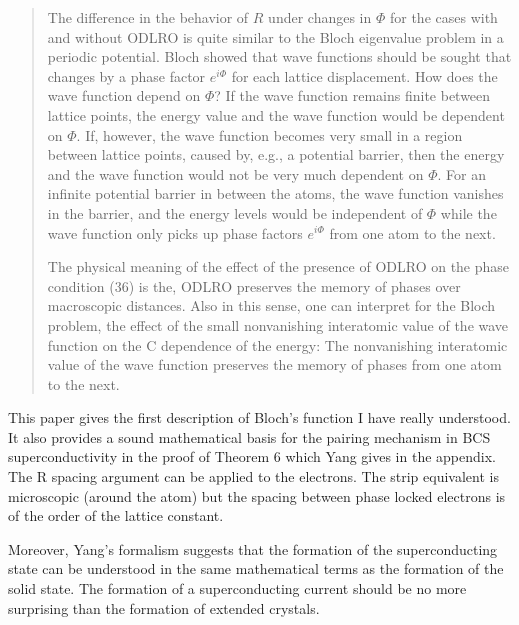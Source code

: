 \documentclass{article}
\begin{document}
\begin{quote}
  The difference in the behavior of $R$ under changes in $\Phi$ for the cases 
with and without ODLRO is quite similar to the Bloch eigenvalue problem
in a periodic potential. Bloch showed that wave functions should be sought 
that changes by a phase factor $e^{i\Phi}$ for each lattice displacement. How does the 
wave function depend on $\Phi$? If the wave function remains finite between lattice points, 
the energy value and the wave function would be dependent on $\Phi$. If, however, 
the wave function becomes very small in a region between lattice points, 
caused by, e.g., a potential barrier, then the energy and the wave function 
would not be very much dependent on $\Phi$. For an infinite potential barrier in 
between the atoms, the wave function vanishes in the barrier, and the energy 
levels would be independent of $\Phi$ while the
wave function only picks up phase factors $e^{i\Phi}$ from one atom to the next.

  The physical meaning of the effect of the presence of ODLRO on the 
phase condition (36) is the, ODLRO preserves the memory of phases over 
macroscopic distances. Also in this sense, one can interpret for the 
Bloch problem, the effect of the small nonvanishing interatomic 
value of the wave function on the C dependence of the energy: 
The nonvanishing interatomic value of the wave function preserves the 
memory of phases from one atom to the next.

\end{quote}

This paper gives the first description of Bloch's function I have really understood. 
It also provides a sound mathematical basis for the pairing mechanism in BCS
superconductivity in the proof of Theorem 6 which Yang gives in the appendix.
The R spacing argument can be applied to the electrons. The strip equivalent
is microscopic (around the atom) but the spacing between phase locked electrons
is of the order of the lattice constant.

Moreover, Yang's formalism suggests that the formation of the superconducting state
can be understood in the same mathematical terms as the formation of the solid state.
The formation of a superconducting current should be no more surprising than the formation
of extended crystals.
\end{document}
